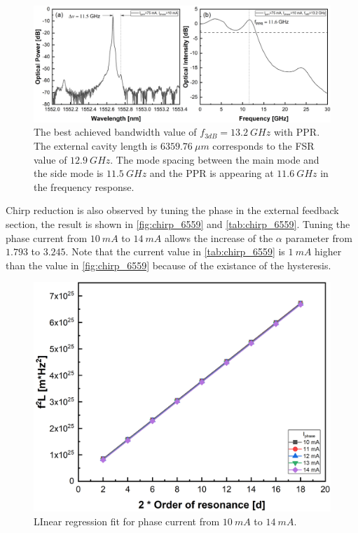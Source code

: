 \begin{figure}[ht]
    \centering
    \includegraphics[width=\linewidth]{figures/spectrum_and_bandwidth_6557.png}
    \caption{The best achieved bandwidth value of $f_{3dB}=13.2 \ GHz$ with PPR. The external cavity length is $6359.76 \ \mu m$ corresponds to the FSR value of $12.9 \ GHz$. The mode spacing between the main mode and the side mode is $11.5 \ GHz$ and the PPR is appearing at $11.6 \ GHz$ in the frequency response.}
    \label{fig:spectra_and_bandwidth_6557}
\end{figure}

Chirp reduction is also observed by tuning the phase in the external feedback section, the result is shown in \autoref{fig:chirp_6559} and \autoref{tab:chirp_6559}. Tuning the phase current from $10 \ mA$ to $14 \ mA$ allows the increase of the $\alpha$ parameter from $1.793$ to $3.245$. Note that the current value in \autoref{tab:chirp_6559} is $1 \ mA$ higher than the value in \autoref{fig:chirp_6559} because of the existance of the hysteresis.

\begin{figure}[H]
    \centering
    \includegraphics[width=.7\linewidth]{figures/chirp_6559.png}
    \caption{LInear regression fit for phase current from $10 \ mA$ to $14 \ mA$.}
    \label{fig:chirp_6559}
\end{figure}


